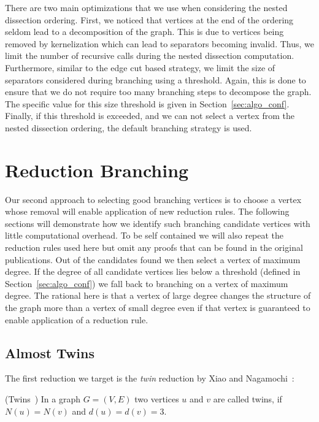 \documentclass[a4paper,UKenglish,cleveref, autoref, thm-restate]{lipics-v2021}
\begin{document}
There are two main optimizations that we use when considering the nested dissection ordering.
First, we noticed that vertices at the end of the ordering seldom lead to a decomposition of the graph. 
This is due to vertices being removed by kernelization which can lead to separators becoming invalid.
Thus, we limit the number of recursive calls during the nested dissection computation.
Furthermore, similar to the edge cut based strategy, we limit the size of
separators considered during branching using a threshold.
Again, this is done to ensure that we do not require too many branching steps to decompose the graph.
The specific value for this size threshold is given in Section~\ref{sec:algo_conf}.
Finally, if this threshold is exceeded, and we can not select a vertex from the nested dissection ordering, the default branching strategy is used.

\section{Reduction Branching}
\label{sec:reduction_branching}
Our second approach to selecting good branching vertices is to choose a vertex
whose removal will enable application of new reduction rules. The following
sections will demonstrate how we identify such branching candidate vertices with little
computational overhead. To be self contained we will also repeat the reduction
rules used here but omit any proofs that can be found in the original
publications. Out of the candidates found we then select a vertex of
maximum degree. If the degree of all candidate vertices lies below a threshold
(defined in Section~\ref{sec:algo_conf}) we fall back to branching on a vertex
of maximum degree. The rational here is that a vertex of large degree changes
the structure of the graph more than a vertex of small degree even if that
vertex is guaranteed to enable application of a reduction rule.

\subsection{Almost Twins}

The first reduction we target is the \emph{twin} reduction by Xiao and Nagamochi~\cite{XiaoUnconfined}:

\begin{definition}(Twins~\cite{XiaoUnconfined})
  In a graph $G=(V,E)$ two vertices $u$ and $v$ are called twins, if $N(u) = N(v)$ and $d(u) = d(v) = 3$.
\end{definition}
\end{document}
